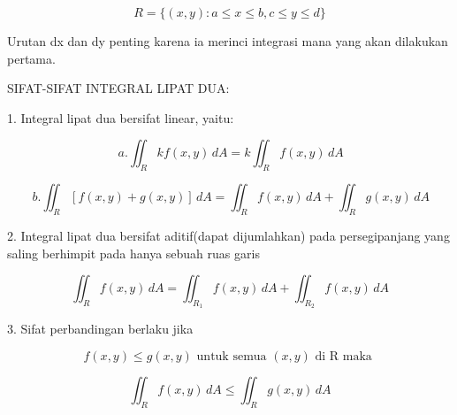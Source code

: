 \documentclass[a4paper,10pt]{article}
\begin{document}
\begin{eulernotebook}
\begin{eulercomment}
\begin{eulercomment}
\begin{eulercomment}
\begin{eulercomment}
\begin{eulercomment}
\begin{eulercomment}
\begin{eulercomment}
\begin{eulercomment}
\begin{eulercomment}
\begin{eulercomment}
\begin{eulercomment}
\begin{eulercomment}
\begin{eulercomment}
\begin{eulercomment}
\begin{eulercomment}
\begin{eulercomment}
\begin{eulercomment}
\begin{eulercomment}
\begin{eulercomment}
\begin{eulercomment}
\begin{eulercomment}
\begin{eulercomment}
\begin{eulercomment}
\begin{eulercomment}
\begin{eulercomment}
\begin{eulercomment}
\begin{eulercomment}
\begin{eulercomment}
\begin{eulercomment}
\begin{eulercomment}
\begin{eulercomment}
\end{eulercomment}
\begin{eulerformula}
\[
R= \{(x,y): a \le x \le b, c \le y \le d \}
\]
\end{eulerformula}
\begin{eulercomment}
Urutan dx dan dy penting karena ia merinci integrasi mana yang akan
dilakukan pertama.

SIFAT-SIFAT INTEGRAL LIPAT DUA:

1. Integral lipat dua bersifat linear, yaitu:\\
\end{eulercomment}
\begin{eulerformula}
\[
\, a. \iint_{R} kf(x,y) \, dA = k \iint_{R} f(x,y) \, dA
\]
\end{eulerformula}
\begin{eulerformula}
\[
\, b. \iint_{R}[f(x,y)+g(x,y)]\, dA = \iint_{R} f(x,y) \, dA + \iint_{R} g(x,y) \, dA
\]
\end{eulerformula}
\begin{eulercomment}
2. Integral lipat dua bersifat aditif(dapat dijumlahkan) pada
persegipanjang yang saling berhimpit pada hanya sebuah ruas garis\\
\end{eulercomment}
\begin{eulerformula}
\[
\iint_{R} f(x,y) \, dA = \iint_{R_1} f(x,y) \, dA + \iint_{R_2} f(x,y) \, dA
\]
\end{eulerformula}
\begin{eulercomment}
3. Sifat perbandingan berlaku jika\\
\end{eulercomment}
\begin{eulerformula}
\[
f(x,y) \le g(x,y) \text{ untuk semua } (x,y) \text{ di R maka }
\]
\end{eulerformula}
\begin{eulerformula}
\[
\iint_{R} f(x,y) \, dA \le \iint_{R} g(x,y) \, dA
\]
\end{eulerformula}

\end{eulercomment}
\end{eulercomment}
\end{eulercomment}
\end{eulercomment}
\end{eulercomment}
\end{eulercomment}
\end{eulercomment}
\end{eulercomment}
\end{eulercomment}
\end{eulercomment}
\end{eulercomment}
\end{eulercomment}
\end{eulercomment}
\end{eulercomment}
\end{eulercomment}
\end{eulercomment}
\end{eulercomment}
\end{eulercomment}
\end{eulercomment}
\end{eulercomment}
\end{eulercomment}
\end{eulercomment}
\end{eulercomment}
\end{eulercomment}
\end{eulercomment}
\end{eulercomment}
\end{eulercomment}
\end{eulercomment}
\end{eulercomment}
\end{eulercomment}
\end{eulernotebook}
\end{document}

